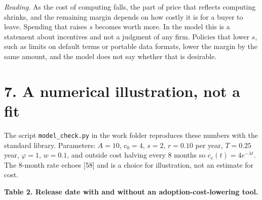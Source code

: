 \documentclass[10pt,letterpaper]{article}
\begin{document}
\emph{Reading.} As the cost of computing falls, the part of price that
reflects computing shrinks, and the remaining margin depends on how
costly it is for a buyer to leave. Spending that raises \(s\) becomes
worth more. In the model this is a statement about incentives and not a
judgment of any firm. Policies that lower \(s\), such as limits on
default terms or portable data formats, lower the margin by the same
amount, and the model does not say whether that is desirable.

\section{7. A numerical illustration, not a
fit}\label{a-numerical-illustration-not-a-fit}

The script \texttt{model\_check.py} in the work folder reproduces these
numbers with the standard library. Parameters: \(A = 10\), \(c_0 = 4\),
\(s = 2\), \(r = 0.10\) per year, \(T = 0.25\) year, \(\varphi = 1\),
\(w = 0.1\), and outside cost halving every 8 months so
\(c_e(t) = 4 e^{-\lambda t}\). The 8-month rate echoes {[}58{]} and is a
choice for illustration, not an estimate for cost.

\textbf{Table 2. Release date with and without an adoption-cost-lowering
tool.}
\end{document}
